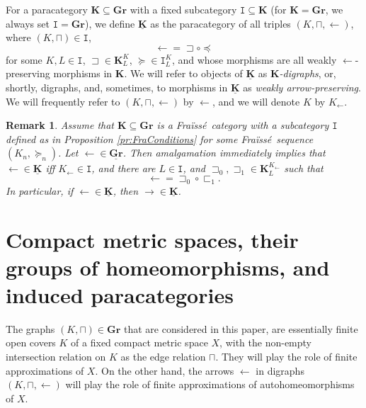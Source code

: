 \documentclass[12pt]{amsart}
\numberwithin{equation}{section}
\theoremstyle{plain}
\newtheorem{remark}[theorem]{\bf Remark}
\theoremstyle{definition}
\newcommand{\sqni}{\mathrel{\vphantom{\sqsupset}\text{\mathsurround=0pt\ooalign{$\sqsupset$\cr$-$\cr}}}}
\newcommand \Id{ \mbox{Id}}
\newcommand \sqsp{\sqsupset}
\newcommand \la{\leftarrow}
\newcommand \ra{\rightarrow}
\newcommand \fra{Fra\"{i}ss\'{e}}
\newcommand \GGRb{\mathbf{Gr}}
\newcommand \KKb{\mathbf{K}}
\newcommand \GGRub{\underline{\mathbf{Gr}}}
\newcommand \KKub{\underline{\mathbf{K}}}
\newcommand \It{\mathtt{I}}
\begin{document}
For a paracategory $\KKb \subseteq \GGRb$ with a fixed subcategory $\It \subseteq \KKb$ (for $\KKb=\GGRb$, we always set $\It=\GGRb$), we define $\KKub$ as the paracategory of all triples $(K,\sqcap, \la)$, where  $(K,\sqcap) \in \It$, $$\la=\sqsp \circ \preceq$$ for some $K, L \in \It$, $\sqsp \in \KKb^K_L$, $\succeq \in \It^K_L$, and whose morphisms are all weakly $\la$-preserving morphisms in $\KKb$.  We will refer to objects of $\KKub$ as \emph{$\KKb$-digraphs}, or, shortly, digraphs, and, sometimes, to morphisms in $\KKub$  as \emph{weakly arrow-preserving}. We will frequently refer to $(K,\sqcap, \la)$ by $\la$, and we will denote $K$ by $K_\la$.



\begin{remark}
\label{re:FraisseDigraphs}
	Assume that $\KKb \subseteq \GGRb$ is a \fra \ category with a subcategory $\It$ defined as in Proposition \ref{pr:FraConditions} for some \fra \ sequence $(K_n,\succeq_n)$. Let $\la \in \GGRub$. Then amalgamation immediately implies that $\la \in \KKub$ iff $K_\la \in \It$, and  there are $L \in \It$,  and $\sqsp_0, \sqsp_1\in \KKb^{K_\la}_L$ such that $$\la=\sqsp_0 \circ \sqsubset_1.$$ In particular, if $\la \in \KKub$, then $\ra \in \KKub$.
\end{remark}


\section{Compact metric spaces,  their groups of homeomorphisms, and induced paracategories}
The graphs $(K,\sqcap) \in \GGRb$ that are considered in this paper, are essentially finite open covers $K$ of a fixed compact metric space $X$, with the non-empty intersection relation on $K$ as the edge relation $\sqcap$. They will play the role of finite approximations of $X$. On the other hand, the arrows $\la$ in digraphs $(K,\sqcap, \la)$ will play the role of finite approximations of autohomeomorphisms of $X$.
\end{document}
